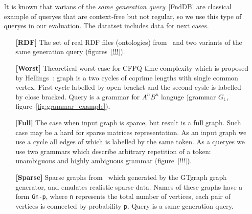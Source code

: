 It is known that varians of the \textit{same generation query}~\ref{FndDB} are classical example of queryes that are context-free but not regular, so we use this type of queryes in our evaluation.
The datatset includes data for next cases.
\begin{itemize}
\item[\textbf{[RDF]}] The set of real RDF files (ontologies) from~\cite{RDF} and two variants of the same generation query (figures~\ref{!!!}).

\item[\textbf{[Worst]}] Theoretical worst case for CFPQ time complexity which is proposed by Hellings~\cite{hellingsPathQuerying}: graph is a two cycles of coprime lengths with single common vertex.
First cycle labelled by open bracket and the second cysle is labelled by close bracked.
Query is a grammar for $A^nB^n$ languge (grammar $G_1$, figure~\ref{fig:grammar_example}).

\item[\textbf{[Full]}] The case when input graph is sparce, but result is a full graph. 
Such case may be a hard for sparse matrices representation.
As an input graph we use a cycle all edges of which is labelled by the same token.
As a queryes we use two grammars which describe arbitrary repetition of a token: unambiguous and highly ambiguous grammar (figure~\ref{!!!}). 

\item[\textbf{[Sparse]}] Sparse graphs from~\cite{fan2018scaling} which generated by the GTgraph graph generator, and emulates realistic sparse data. 
Names of these graphs have a form \texttt{Gn-p}, where \texttt{n} represents the total number of vertices, each pair of vertices is connected by probability \texttt{p}. 
Query is a same generation query.

\end{itemize}

